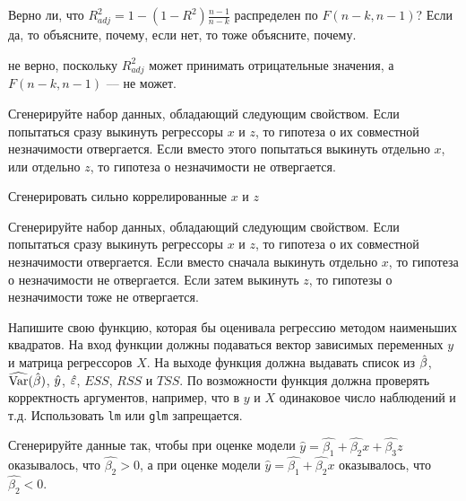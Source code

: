 \documentclass[pdftex,11pt,openany]{book}\usepackage[]{graphicx}\usepackage[]{color}
\begin{document}
\begin{problem}
Верно ли, что $R_{adj}^2 = 1 - (1 - R^2)\frac{n-1}{n-k}$ распределен по $F(n-k, n-1)$? Если да, то объясните, почему, если нет, то тоже объясните, почему.
\end{problem}

\begin{solution}
не верно, поскольку $R_{adj}^2$ может принимать отрицательные значения, а $F(n-k, n-1)$ --– не может.
\end{solution}


\begin{problem}
Сгенерируйте набор данных, обладающий следующим свойством. Если попытаться сразу выкинуть регрессоры $x$ и $z$, то гипотеза о их совместной незначимости отвергается. Если вместо этого попытаться выкинуть отдельно $x$, или отдельно $z$, то гипотеза о незначимости не отвергается.
\end{problem}

\begin{solution}
Сгенерировать сильно коррелированные $x$ и $z$
\end{solution}


\begin{problem}
Сгенерируйте набор данных, обладающий следующим свойством. Если попытаться сразу выкинуть регрессоры $x$ и $z$, то гипотеза о их совместной незначимости отвергается. Если вместо сначала выкинуть отдельно $x$, то гипотеза о незначимости не отвергается. Если затем выкинуть $z$, то гипотезы о незначимости тоже не отвергается.
\end{problem}

\begin{solution}
\end{solution}

\begin{problem}
Напишите свою функцию, которая бы оценивала регрессию методом наименьших квадратов. На вход функции должны подаваться вектор зависимых переменных $y$ и матрица регрессоров $X$. На выходе функция должна выдавать список из $\hat{\beta}$, $\widehat{\operatorname{Var}}(\hat{\beta})$, $\hat{y}$, $\hat{\varepsilon}$, $ESS$, $RSS$ и $TSS$. По возможности функция должна проверять корректность аргументов, например, что в $y$ и $X$ одинаковое число наблюдений и т.д. Использовать \verb|lm| или \verb|glm| запрещается.
\end{problem}

\begin{solution}
\end{solution}


\begin{problem}
Сгенерируйте данные так, чтобы при оценке модели $\hat{y}=\hat{\beta_1}+\hat{\beta_2}x+\hat{\beta_3}z$ оказывалось, что $\hat{\beta_2}>0$, а при оценке модели $\hat{y}=\hat{\beta_1}+\hat{\beta_2}x$ оказывалось, что $\hat{\beta_2}<0$.
\end{problem}
\end{document}
